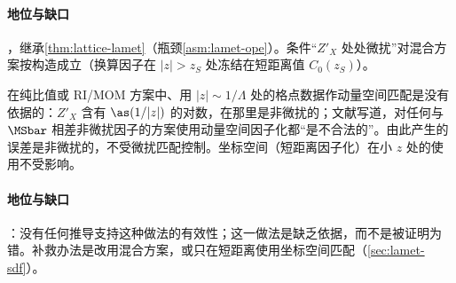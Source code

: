 \paragraph{地位与缺口}
\tagA，继承\cref{thm:lattice-lamet}（瓶颈\cref{asm:lamet-ope}）。条件“$Z'_X$ 处处微扰”对混合方案按构造成立（换算因子在 $|z|>z_S$ 处冻结在短距离值 $C_0(z_S)$）。

\begin{remark}\label{rem:lamet-ratio-large-z}
在纯比值或 RI/MOM 方案中、用 $|z|\sim1/\Lambda$ 处的格点数据作动量空间匹配是没有依据的：$Z'_X$ 含有 $\as(1/|z|)$ 的对数，在那里是非微扰的；文献\cite{JiEtAl2021}写道，对任何与 $\MSbar$ 相差非微扰因子的方案使用动量空间因子化都“是不合法的”。由此产生的误差是非微扰的，不受微扰匹配控制。坐标空间（短距离因子化）在小 $z$ 处的使用不受影响。
\end{remark}

\paragraph{地位与缺口}
\tagC：没有任何推导支持这种做法的有效性；这一做法是缺乏依据，而不是被证明为错。补救办法是改用混合方案，或只在短距离使用坐标空间匹配（\cref{sec:lamet-sdf}）。

